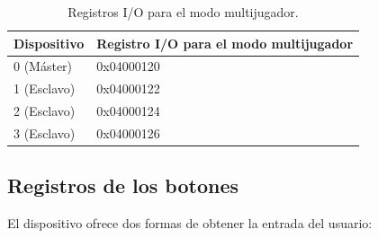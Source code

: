 \begin{table}[h]
	\centering
	\begin{tabular}{| l | l |}
		\hline
		\textbf{Dispositivo} & \textbf{Registro I/O para el modo multijugador} \\ \hline
		0 (Máster) &  0x04000120 \\ \hline
		1 (Esclavo) &  0x04000122 \\ \hline
		2 (Esclavo) &  0x04000124 \\ \hline
		3 (Esclavo) &  0x04000126 \\ \hline
	\end{tabular}
	\caption{Registros I/O para el modo multijugador.}\label{tab:mult_modo}
\end{table}
\FloatBarrier{}

\subsection{Registros de los botones}
El dispositivo ofrece dos formas de obtener la entrada del usuario:

